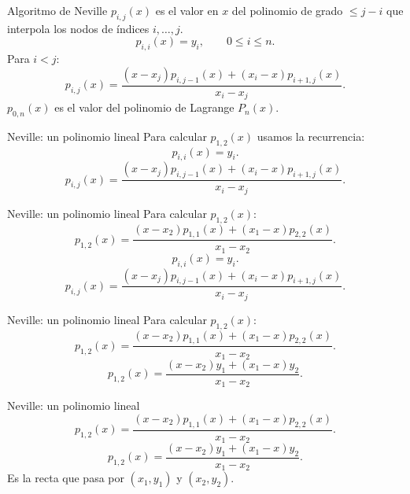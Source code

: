 \documentclass[original_version/main.tex]{subfiles}
\begin{document}
\begin{frame}[t]{Algoritmo de Neville}
\small $p_{i,j}(x)$ es el valor en $x$ del polinomio de grado $\le j-i$ que interpola los nodos de índices $i,\ldots,j$.
\[p_{i,i}(x)=y_i,\qquad 0\le i\le n.\]
Para $i<j$:
\[p_{i,j}(x)=\frac{(x-x_j)p_{i,j-1}(x)+(x_i-x)p_{i+1,j}(x)}{x_i-x_j}.\]\medskip $p_{0,n}(x)$ es el valor del polinomio de Lagrange $P_n(x)$.
\end{frame}
\begin{frame}[t]{Neville: un polinomio lineal}
Para calcular $p_{1,2}(x)$ usamos la recurrencia:\[p_{i,i}(x)=y_i.\]\[p_{i,j}(x)=\frac{(x-x_j)p_{i,j-1}(x)+(x_i-x)p_{i+1,j}(x)}{x_i-x_j}.\]
\end{frame}
\begin{frame}[t]{Neville: un polinomio lineal}
Para calcular $p_{1,2}(x)$:\[p_{1,2}(x)=\frac{(x-x_2)p_{1,1}(x)+(x_1-x)p_{2,2}(x)}{x_1-x_2}.\]\[p_{i,i}(x)=y_i.\]\[p_{i,j}(x)=\frac{(x-x_j)p_{i,j-1}(x)+(x_i-x)p_{i+1,j}(x)}{x_i-x_j}.\]
\end{frame}
\begin{frame}[t]{Neville: un polinomio lineal}
Para calcular $p_{1,2}(x)$:\[p_{1,2}(x)=\frac{(x-x_2)p_{1,1}(x)+(x_1-x)p_{2,2}(x)}{x_1-x_2}.\]\[p_{1,2}(x)=\frac{(x-x_2)y_1+(x_1-x)y_2}{x_1-x_2}.\]
\end{frame}
\begin{frame}[t]{Neville: un polinomio lineal}
\[p_{1,2}(x)=\frac{(x-x_2)p_{1,1}(x)+(x_1-x)p_{2,2}(x)}{x_1-x_2}.\]\[p_{1,2}(x)=\frac{(x-x_2)y_1+(x_1-x)y_2}{x_1-x_2}.\]Es la recta que pasa por $(x_1,y_1)$ y $(x_2,y_2)$.
\end{frame}
\end{document}
